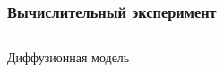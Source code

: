 \documentclass[8pt]{beamer}
\begin{document}
\begin{frame}
	\frametitle{Вычислительный эксперимент}
		\begin{columns}
			\begin{column}{0.8\textwidth}
				\begin{block}{Диффузионная модель}
				 	\begin{figure}[H]
				 	\end{figure}
			 	\end{block}
			\end{column}
			\begin{column}{0.23\textwidth}
					\begin{figure}[H]
						

\end{figure}
\end{column}
\end{columns}
\end{frame}
\end{document}
